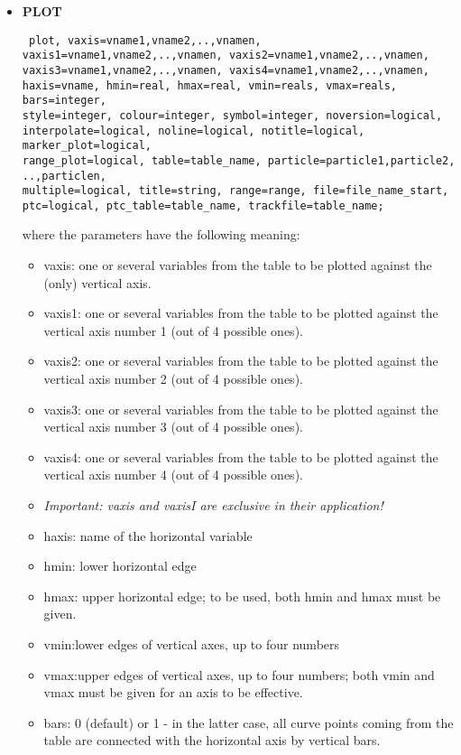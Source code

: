 \begin{itemize}
	\item \textbf{PLOT}
	
\begin{verbatim}
 plot, vaxis=vname1,vname2,..,vnamen,
vaxis1=vname1,vname2,..,vnamen, vaxis2=vname1,vname2,..,vnamen,
vaxis3=vname1,vname2,..,vnamen, vaxis4=vname1,vname2,..,vnamen,
haxis=vname, hmin=real, hmax=real, vmin=reals, vmax=reals, bars=integer,
style=integer, colour=integer, symbol=integer, noversion=logical,
interpolate=logical, noline=logical, notitle=logical, marker_plot=logical, 
range_plot=logical, table=table_name, particle=particle1,particle2,
..,particlen,
multiple=logical, title=string, range=range, file=file_name_start, 
ptc=logical, ptc_table=table_name, trackfile=table_name; 
\end{verbatim} where the parameters have the following meaning: 
\begin{itemize}
	\item vaxis: one or several variables from the table to be plotted against the (only) vertical axis.  
	\item vaxis1: one or several variables from the table to be plotted against the vertical axis number 1 (out of 4 possible ones). 
	\item vaxis2: one or several variables from the table to be plotted against the vertical axis number 2 (out of 4 possible ones). 
	\item vaxis3: one or several variables from the table to be plotted against the vertical axis number 3 (out of 4 possible ones). 
	\item vaxis4: one or several variables from the table to be plotted against the vertical axis number 4 (out of 4 possible ones). 
	\item \textit{Important: vaxis and vaxisI are exclusive in their application!}
	\item haxis: name of the horizontal variable 
	\item hmin: lower horizontal edge 
	\item hmax: upper horizontal edge; to be used, both hmin and hmax must be given.  
	\item vmin:lower edges of vertical axes, up to four numbers 
	\item vmax:upper edges of vertical axes, up to four numbers; both vmin and vmax must be given for an axis to be effective.  
	\item bars: 0 (default) or 1 - in the latter case, all curve points coming from the table are connected with the horizontal axis by vertical bars.  

\end{itemize}
\end{itemize}
